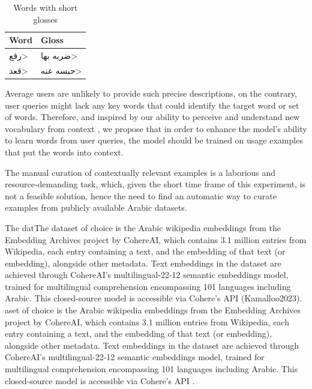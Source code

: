 \documentclass[15pt]{article}
\begin{document}
\begin{table}[H]
    \centering
    \caption{Words with short glosses}
    \label{table:word-short-gloss}
    \renewcommand{\arraystretch}{1.5}%
    \begin{tabularx}{\textwidth}{|X|X|}
        \hline
        \textbf{Word} & \textbf{Gloss} \\
        \hline
        \<رقع> & \<ضربه بها> \\
        \hline
        \<قعد> & \<حبسه عنه> \\
        \hline
    \end{tabularx}
\end{table}

Average users are unlikely to provide such precise descriptions, on the contrary, user queries might lack any key words that could identify the target word or set of words. Therefore, and inspired by our ability to perceive and understand new vocabulary from context \cite{killian1995}, we propose that in order to enhance the model’s ability to learn words from user queries, the model should be trained on usage examples that put the words into context.

The manual curation of contextually relevant examples is a laborious and resource-demanding task, which, given the short time frame of this experiment, is not a feasible solution, hence the need to find an automatic way to curate examples from publicly available Arabic datasets. 

The datThe dataset of choice is the Arabic wikipedia embeddings from the Embedding Archives project by CohereAI, which contains 3.1 million entries from Wikipedia, each entry containing a text, and the embedding of that text (or embedding), alongside other metadata. Text embeddings in the dataset are achieved through CohereAI's multilingual-22-12 semantic embeddings model, trained for multilingual comprehension encompassing 101 languages including Arabic. This closed-source model is accessible via Cohere's API (Kamalloo2023).
aset of choice is the Arabic wikipedia embeddings from the Embedding Archives project by CohereAI, which contains 3.1 million entries from Wikipedia, each entry containing a text, and the embedding of that text (or embedding), alongside other metadata. Text embeddings in the dataset are achieved through CohereAI's multilingual-22-12 semantic embeddings model, trained for multilingual comprehension encompassing 101 languages including Arabic. This closed-source model is accessible via Cohere's API \cite{Kamalloo2023}.
\end{document}
